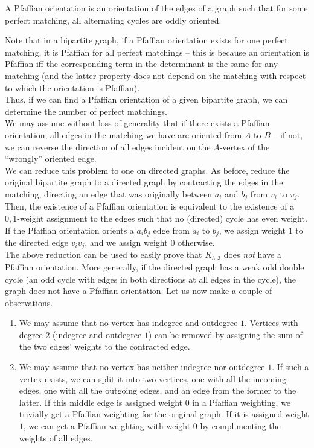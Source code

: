 \begin{fdef}
	A Pfaffian orientation is an orientation of the edges of a graph such that for some perfect matching, all alternating cycles are oddly oriented. 
\end{fdef}
Note that in a bipartite graph, if a Pfaffian orientation exists for one perfect matching, it is Pfaffian for all perfect matchings -- this is because an orientation is Pfaffian iff the corresponding term in the determinant is the same for any matching (and the latter property does not depend on the matching with respect to which the orientation is Pfaffian).\\

Thus, if we can find a Pfaffian orientation of a given bipartite graph, we can determine the number of perfect matchings.\\
We may assume without loss of generality that if there exists a Pfaffian orientation, all edges in the matching we have are oriented from $A$ to $B$ -- if not, we can reverse the direction of all edges incident on the $A$-vertex of the ``wrongly'' oriented edge.\\
We can reduce this problem to one on directed graphs. As before, reduce the original bipartite graph to a directed graph by contracting the edges in the matching, directing an edge that was originally between $a_i$ and $b_j$ from $v_i$ to $v_j$. Then, the existence of a Pfaffian orientation is equivalent to the existence of a $0,1$-weight assignment to the edges such that no (directed) cycle has even weight. If the Pfaffian orientation orients a $a_ib_j$ edge from $a_i$ to $b_j$, we assign weight $1$ to the directed edge $v_iv_j$, and we assign weight $0$ otherwise.\\
The above reduction can be used to easily prove that $K_{3,3}$ does \emph{not} have a Pfaffian orientation. More generally, if the directed graph has a weak odd double cycle (an odd cycle with edges in both directions at all edges in the cycle), the graph does not have a Pfaffian orientation. Let us now make a couple of observations.
\begin{enumerate}
	\item We may assume that no vertex has indegree and outdegree $1$. Vertices with degree $2$ (indegree and outdegree $1$) can be removed by assigning the sum of the two edges' weights to the contracted edge.
	\item We may assume that no vertex has neither indegree nor outdegree $1$. If such a vertex exists, we can split it into two vertices, one with all the incoming edges, one with all the outgoing edges, and an edge from the former to the latter. If this middle edge is assigned weight $0$ in a Pfaffian weighting, we trivially get a Pfaffian weighting for the original graph. If it is assigned weight $1$, we can get a Pfaffian weighting with weight $0$ by complimenting the weights of all edges.
\end{enumerate}

